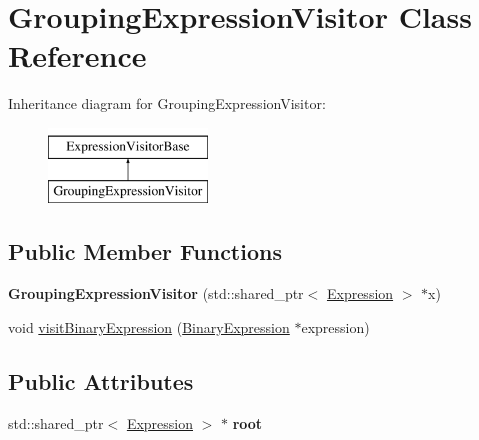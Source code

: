 \hypertarget{class_grouping_expression_visitor}{\section{Grouping\+Expression\+Visitor Class Reference}
\label{class_grouping_expression_visitor}
}
Inheritance diagram for Grouping\+Expression\+Visitor\+:\begin{figure}[H]
\begin{center}
\leavevmode
\includegraphics[height=2.000000cm]{class_grouping_expression_visitor}
\end{center}
\end{figure}
\subsection*{Public Member Functions}
\begin{DoxyCompactItemize}
\item 
\hypertarget{class_grouping_expression_visitor_a237e5aaa25294095a1b3c14c4ef64794}{{\bfseries Grouping\+Expression\+Visitor} (std\+::shared\+\_\+ptr$<$ \hyperlink{class_expression}{Expression} $>$ $\ast$x)}\label{class_grouping_expression_visitor_a237e5aaa25294095a1b3c14c4ef64794}

\item 
void \hyperlink{class_grouping_expression_visitor_aba30832e7f966be15e50b17d68badbb1}{visit\+Binary\+Expression} (\hyperlink{class_binary_expression}{Binary\+Expression} $\ast$expression)
\end{DoxyCompactItemize}
\subsection*{Public Attributes}
\begin{DoxyCompactItemize}
\item 
\hypertarget{class_grouping_expression_visitor_a493ef343ca18357dca158d83085b5ab4}{std\+::shared\+\_\+ptr$<$ \hyperlink{class_expression}{Expression} $>$ $\ast$ {\bfseries root}}\label{class_grouping_expression_visitor_a493ef343ca18357dca158d83085b5ab4}

\end{DoxyCompactItemize}


